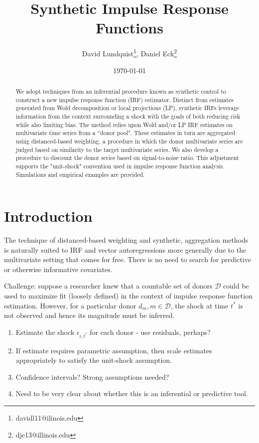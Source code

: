 \documentclass[11pt]{article}
\title{Synthetic Impulse Response Functions}
\author{David Lundquist\thanks{davidl11@ilinois.edu}, Daniel Eck\thanks{dje13@illinois.edu} }
\affil{Department of Statistics, University of Illinois at Urbana-Champaign}
\date{\today}
\theoremstyle{definition}
\begin{document}
\maketitle

\begin{abstract}
We adopt techniques from an inferential procedure known as synthetic control to construct a new impulse response function (IRF) estimator.  Distinct from estimates generated from Wold decomposition or local projections (LP), synthetic IRFs leverage information from the context surrounding a shock with the goals of both reducing risk while also limiting bias.  The method relies upon Wold and/or LP IRF estimates on multivariate time series from a ``donor pool".  These estimates in turn are aggregated using distanced-based weighting, a procedure in which the donor multivariate series are judged based on similarity to the target multivariate series.  We also develop a procedure to discount the donor series based on signal-to-noise ratio.  This adjustment supports the "unit-shock" convention used in impulse response function analysis.  Simulations and empirical examples are provided.

\end{abstract}

\section{Introduction}

The technique of distanced-based weighting and synthetic, aggregation methods is naturally suited to IRF and vector autoregressions more generally due to the multivariate setting that comes for free.  There is no need to search for predictive or otherwise informative covariates.  

Challenge: suppose a researcher knew that a countable set of donors $\mathcal{D}$ could be used to maximize fit (loosely defined) in the context of impulse response function estimation.  However, for a particular donor $d_{m}, m\in \mathcal{D}$, the shock at time $t^*$ is not observed and hence its magnitude must be inferred.

\begin{enumerate}
    \item Estimate the shock $\epsilon_{i,t^*}$ for each donor - use residuals, perhaps?
    \item If estimate requires parametric assumption, then scale estimates appropriately to satisfy the unit-shock assumption.
    \item Confidence intervals?  Strong assumptions needed?
    \item Need to be very clear about whether this is an inferential or predictive tool.
\end{enumerate}
\end{document}

